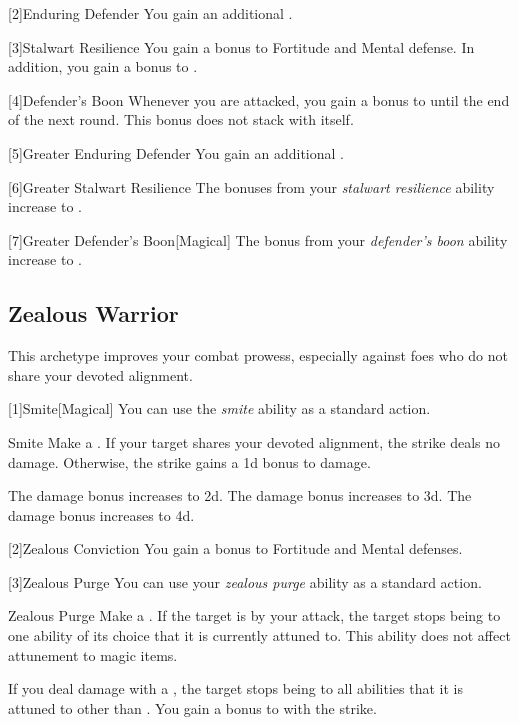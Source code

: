         [2]{Enduring Defender}
        You gain an additional .

        [3]{Stalwart Resilience}
        You gain a  bonus to Fortitude and Mental defense.
        In addition, you gain a  bonus to .

        [4]{Defender's Boon}
        Whenever you are attacked, you gain a  bonus to  until the end of the next round.
        This bonus does not stack with itself.

        [5]{Greater Enduring Defender}
        You gain an additional .

        [6]{Greater Stalwart Resilience} The bonuses from your \textit{stalwart resilience} ability increase to .

        [7]{Greater Defender's Boon}[Magical]
        The bonus from your \textit{defender's boon} ability increase to .

    \subsection{Zealous Warrior}
        This archetype improves your combat prowess, especially against foes who do not share your devoted alignment.

        [1]{Smite}[Magical] You can use the \textit{smite} ability as a standard action.
        \begin{freeability}{Smite}
            Make a .
            If your target shares your devoted alignment, the strike deals no damage.
            Otherwise, the strike gains a \plus1d bonus to damage.

            \rankline
             The damage bonus increases to \plus2d.
             The damage bonus increases to \plus3d.
             The damage bonus increases to \plus4d.
        \end{freeability}

        [2]{Zealous Conviction} You gain a  bonus to Fortitude and Mental defenses.

        [3]{Zealous Purge} You can use your \textit{zealous purge} ability as a standard action.
        \begin{freeability}{Zealous Purge}
            Make a .
            If the target is  by your attack, the target stops being  to one ability of its choice that it is currently attuned to.
            This ability does not affect attunement to magic items.

            \rankline
             If you deal damage with a , the target stops being  to all abilities that it is attuned to other than .
             You gain a  bonus to  with the strike.
        \end{freeability}

